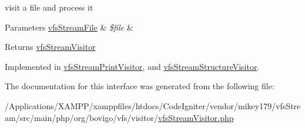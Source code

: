 visit a file and process it


\begin{DoxyParams}[1]{Parameters}
\mbox{\hyperlink{classorg_1_1bovigo_1_1vfs_1_1vfs_stream_file}{vfs\+Stream\+File}} & {\em \$file} & \\
\hline
\end{DoxyParams}
\begin{DoxyReturn}{Returns}
\mbox{\hyperlink{interfaceorg_1_1bovigo_1_1vfs_1_1visitor_1_1vfs_stream_visitor}{vfs\+Stream\+Visitor}} 
\end{DoxyReturn}


Implemented in \mbox{\hyperlink{classorg_1_1bovigo_1_1vfs_1_1visitor_1_1vfs_stream_print_visitor_aefbf1a8429cc874e03034c19eeba5a07}{vfs\+Stream\+Print\+Visitor}}, and \mbox{\hyperlink{classorg_1_1bovigo_1_1vfs_1_1visitor_1_1vfs_stream_structure_visitor_aefbf1a8429cc874e03034c19eeba5a07}{vfs\+Stream\+Structure\+Visitor}}.



The documentation for this interface was generated from the following file\+:\begin{DoxyCompactItemize}
\item 
/\+Applications/\+X\+A\+M\+P\+P/xamppfiles/htdocs/\+Code\+Igniter/vendor/mikey179/vfs\+Stream/src/main/php/org/bovigo/vfs/visitor/\mbox{\hyperlink{vfs_stream_visitor_8php}{vfs\+Stream\+Visitor.\+php}}\end{DoxyCompactItemize}
